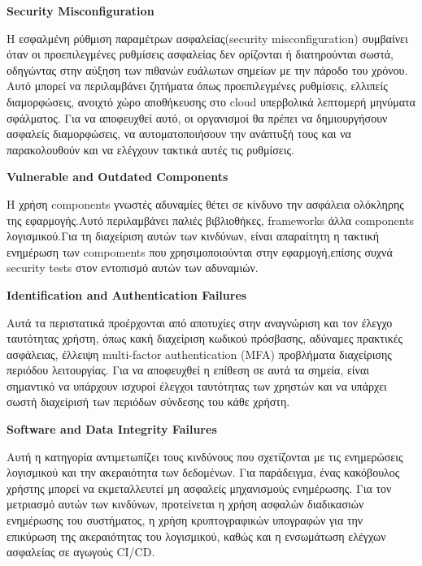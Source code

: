 \begin{center}
    \textbf{\lt Security Misconfiguration}
\end{center}

Η εσφαλμένη ρύθμιση παραμέτρων ασφαλείας(\lt security misconfiguration) \gt συμβαίνει όταν οι προεπιλεγμένες ρυθμίσεις ασφαλείας δεν ορίζονται ή διατηρούνται σωστά, οδηγώντας στην αύξηση των πιθανών ευάλωτων σημείων με την πάροδο του χρόνου. Αυτό μπορεί να περιλαμβάνει ζητήματα όπως προεπιλεγμένες ρυθμίσεις, ελλιπείς διαμορφώσεις, ανοιχτό χώρο αποθήκευσης στο \lt cloud  υπερβολικά λεπτομερή μηνύματα σφάλματος. Για να αποφευχθεί αυτό, οι οργανισμοί θα πρέπει να δημιουργήσουν ασφαλείς διαμορφώσεις, να αυτοματοποιήσουν την ανάπτυξή τους και να παρακολουθούν και να ελέγχουν τακτικά αυτές τις ρυθμίσεις.

\begin{center}
    \textbf{\lt Vulnerable and Outdated Components}
\end{center}

Η χρήση \lt components  γνωστές αδυναμίες θέτει σε κίνδυνο την ασφάλεια ολόκληρης της εφαρμογής.Αυτό περιλαμβάνει παλιές βιβλιοθήκες, \lt frameworks  άλλα \lt components  λογισμικού.Για τη διαχείριση αυτών των κινδύνων, είναι απαραίτητη η τακτική ενημέρωση των compoments που χρησιμοποιούνται στην εφαρμογή,επίσης συχνά \lt security tests  στον εντοπισμό αυτών των αδυναμιών.

\begin{center}
    \textbf{\lt  Identification and Authentication Failures}
\end{center}

Αυτά τα περιστατικά προέρχονται από αποτυχίες στην αναγνώριση και τον έλεγχο ταυτότητας χρήστη, όπως κακή διαχείριση κωδικού πρόσβασης, αδύναμες πρακτικές ασφάλειας, έλλειψη \lt multi-factor authentication (MFA)  προβλήματα διαχείρισης περιόδου λειτουργίας. Για να αποφευχθεί η επίθεση σε αυτά τα σημεία, είναι σημαντικό να υπάρχουν ισχυροί έλεγχοι ταυτότητας των χρηστών και να υπάρχει σωστή διαχείρισή των περιόδων σύνδεσης του κάθε χρήστη.

\begin{center}
    \textbf{\lt Software and Data Integrity Failures}
\end{center}

Αυτή η κατηγορία αντιμετωπίζει τους κινδύνους που σχετίζονται με τις ενημερώσεις λογισμικού και την ακεραιότητα των δεδομένων. Για παράδειγμα, ένας κακόβουλος χρήστης μπορεί να εκμεταλλευτεί μη ασφαλείς μηχανισμούς ενημέρωσης. Για τον μετριασμό αυτών των κινδύνων, προτείνεται η χρήση ασφαλών διαδικασιών ενημέρωσης του συστήματος, η χρήση κρυπτογραφικών υπογραφών για την επικύρωση της ακεραιότητας του λογισμικού, καθώς και η ενσωμάτωση ελέγχων ασφαλείας σε αγωγούς \lt CI/CD.

